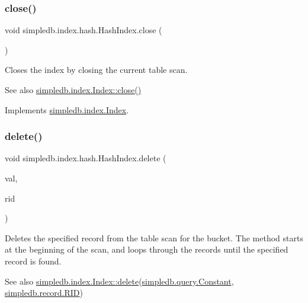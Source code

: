 \subsubsection{\texorpdfstring{close()}{close()}}
{\footnotesize\ttfamily void simpledb.\+index.\+hash.\+Hash\+Index.\+close (\begin{DoxyParamCaption}{ }\end{DoxyParamCaption})\hspace{0.3cm}{\ttfamily [inline]}}

Closes the index by closing the current table scan. \begin{DoxySeeAlso}{See also}
\hyperlink{interfacesimpledb_1_1index_1_1Index_aedde7a12ff7788c1dc00ef9404b4266e}{simpledb.\+index.\+Index\+::close()} 
\end{DoxySeeAlso}


Implements \hyperlink{interfacesimpledb_1_1index_1_1Index_aedde7a12ff7788c1dc00ef9404b4266e}{simpledb.\+index.\+Index}.

\mbox{\label{classsimpledb_1_1index_1_1hash_1_1HashIndex_a76d2d6f98901db61549cfe51a1433d45}} 
\subsubsection{\texorpdfstring{delete()}{delete()}}
{\footnotesize\ttfamily void simpledb.\+index.\+hash.\+Hash\+Index.\+delete (\begin{DoxyParamCaption}\item[{\hyperlink{classsimpledb_1_1query_1_1Constant}{Constant}}]{val,  }\item[{\hyperlink{classsimpledb_1_1record_1_1RID}{R\+ID}}]{rid }\end{DoxyParamCaption})\hspace{0.3cm}{\ttfamily [inline]}}

Deletes the specified record from the table scan for the bucket. The method starts at the beginning of the scan, and loops through the records until the specified record is found. \begin{DoxySeeAlso}{See also}
\hyperlink{interfacesimpledb_1_1index_1_1Index_a3bbe4098bf5422023391ce24f2e7df88}{simpledb.\+index.\+Index\+::delete}(\hyperlink{classsimpledb_1_1query_1_1Constant}{simpledb.\+query.\+Constant}, \hyperlink{classsimpledb_1_1record_1_1RID}{simpledb.\+record.\+R\+ID}) 
\end{DoxySeeAlso}


